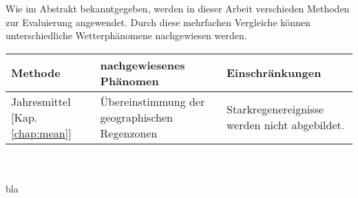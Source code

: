 Wie im Abstrakt bekanntgegeben, werden in dieser Arbeit verschieden Methoden zur Evaluierung angewendet. Durch diese mehrfachen Vergleiche können unterschiedliche Wetterphänomene nachgewiesen werden.\\

\begin{tabularx}{\textwidth}{|X|X|X|}
		\hline
		\textbf{Methode} & \textbf{nachgewiesenes Phänomen}& \textbf{Einschränkungen}\\
		\hline
		Jahresmittel [Kap. \ref{chap:mean}] & Übereinstimmung der geographischen Regenzonen & Starkregenereignisse werden nicht abgebildet.\\
		\hline
\end{tabularx}
\\ \hfill \\
bla
